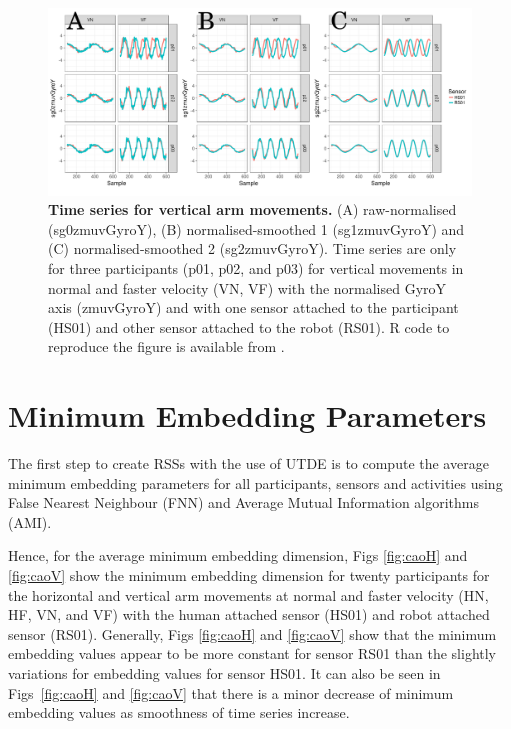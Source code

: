 \begin{figure}[!h]
  \centering
\includegraphics[width=1.0\textwidth]{tsVv03}
	\caption{ 
	{\bf Time series for vertical arm movements.}
		(A) raw-normalised (sg0zmuvGyroY), 
		(B) normalised-smoothed 1 (sg1zmuvGyroY) and
		(C) normalised-smoothed 2 (sg2zmuvGyroY).
		Time series are only for three participants (p01, p02, and p03) 
		for vertical movements in normal and faster velocity (VN, VF) 
		with the normalised GyroY axis (zmuvGyroY) 
		and with one sensor attached to the participant (HS01) 
		and other sensor attached to the robot (RS01).
		R code to reproduce the figure is available 
		from \cite{hwum2018}.
        }
    \label{fig:tsV}
\end{figure}







\section{Minimum Embedding Parameters}
The first step to create RSSs with the use of UTDE is to compute the
average minimum embedding parameters for all participants, sensors and 
activities using False Nearest Neighbour (FNN) and 
Average Mutual Information algorithms (AMI).

Hence, for the average minimum embedding dimension, 
Figs \ref{fig:caoH} and \ref{fig:caoV} show the minimum embedding 
dimension for twenty participants for the horizontal and vertical arm
movements at normal and faster velocity (HN, HF, VN, and VF) with the 
human attached sensor (HS01) and robot attached sensor (RS01).
Generally, Figs \ref{fig:caoH} and \ref{fig:caoV} show that the minimum 
embedding values appear to be more constant for sensor RS01 than the 
slightly variations for embedding values for sensor HS01.
It can also be seen in Figs~\ref{fig:caoH} and \ref{fig:caoV} that there 
is a minor decrease of minimum embedding values as smoothness of time 
series increase. 

